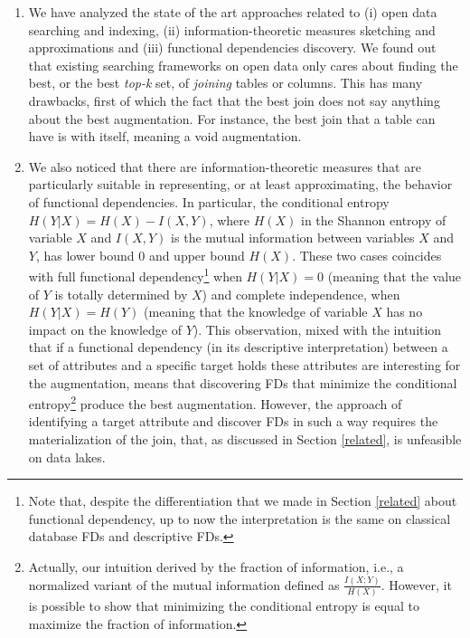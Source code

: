 \begin{enumerate}
    \item We have analyzed the state of the art approaches related to (i) open data searching and indexing, (ii) information-theoretic measures sketching and approximations and (iii) functional dependencies discovery. We found out that existing searching frameworks on open data only cares about finding the best, or the best \textit{top-k} set, of \textit{joining} tables or columns. This has many drawbacks, first of which the fact that the best join does not say anything about the best augmentation. For instance, the best join that a table can have is with itself, meaning a void augmentation. 
    \item We also noticed that there are information-theoretic measures that are particularly suitable in representing, or at least approximating, the behavior of functional dependencies. In particular, the conditional entropy $H(Y|X) = H(X)-I(X,Y)$, where $H(X)$ in the Shannon entropy of variable $X$ and $I(X,Y)$ is the mutual information between variables $X$ and $Y$, has lower bound 0 and upper bound $H(X)$. These two cases coincides with full functional dependency\footnote{Note that, despite the differentiation that we made in Section \ref{related} about functional dependency, up to now the interpretation is the same on classical database FDs and descriptive FDs.} when $H(Y|X) = 0$ (meaning that the value of $Y$ is totally determined by $X$) and complete independence, when $H(Y|X) = H(Y)$ (meaning that the knowledge of variable $X$ has no impact on the knowledge of $Y$). This observation, mixed with the intuition that if a functional dependency (in its descriptive interpretation) between a set of attributes and a specific target holds these attributes are interesting for the augmentation, means that discovering FDs that minimize the conditional entropy\footnote{Actually, our intuition derived by the fraction of information, i.e., a normalized variant of the mutual information defined as $\frac{I(X;Y)}{H(X)}$. However, it is possible to show that minimizing the conditional entropy is equal to maximize the fraction of information.} produce the best augmentation. However, the approach of identifying a target attribute and discover FDs in such a way requires the materialization of the join, that, as discussed in Section \ref{related}, is unfeasible on data lakes.

\end{enumerate}
